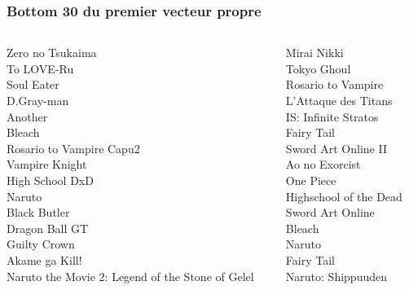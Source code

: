 \documentclass[handout]{beamer}
\begin{document}
\begin{frame}
    \frametitle{Bottom 30 du premier vecteur propre}
    \begin{columns}
    \begin{column}{0.5\textwidth}
                                   Zero no Tsukaima\\
                                         To LOVE-Ru\\
                                         Soul Eater\\
                                         D.Gray-man\\
                                            Another\\
                                             Bleach\\
                           Rosario to Vampire Capu2\\
                                     Vampire Knight\\
                                    High School DxD\\
                                             Naruto\\
                                       Black Butler\\
                                     Dragon Ball GT\\
                                       Guilty Crown\\
                                     Akame ga Kill!\\
   Naruto the Movie 2: Legend of the Stone of Gelel\\
    \end{column}
    \begin{column}{0.5\textwidth}
                                        Mirai Nikki\\
                                        Tokyo Ghoul\\
                                 Rosario to Vampire\\
                               L'Attaque des Titans\\
                               IS: Infinite Stratos\\
                                         Fairy Tail\\
                                Sword Art Online II\\
                                     Ao no Exorcist\\
                                          One Piece\\
                             Highschool of the Dead\\
                                   Sword Art Online\\
                                             Bleach\\
                                             Naruto\\
                                         Fairy Tail\\
                                 Naruto: Shippuuden\\
    \end{column}
    \end{columns}
\end{frame}
\end{document}
